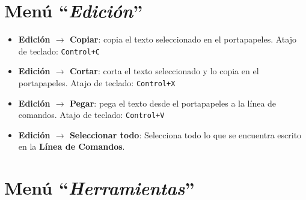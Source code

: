 \section{Men\'u ``\textit{Edici\'on}''}
   \label{Menu-Edicion}

\begin{itemize}
   \item \textbf{Edici\'on $\rightarrow$ Copiar}: copia el texto
      seleccionado en el portapapeles. Atajo de teclado: \texttt{Control+C}
   \item \textbf{Edici\'on $\rightarrow$ Cortar}: corta el texto
      seleccionado y lo copia en el portapapeles. Atajo de teclado:
      \texttt{Control+X}
   \item \textbf{Edici\'on $\rightarrow$ Pegar}: pega el texto desde el
      portapapeles a la l\'inea de comandos. Atajo de teclado:
      \texttt{Control+V}
   \item \textbf{Edici\'on $\rightarrow$ Seleccionar todo}:
      Selecciona todo lo que se encuentra escrito en la
      \textbf{L\'inea de Comandos}.
\end{itemize}

\section{Men\'u ``\textit{Herramientas}''}
   \label{Menu-Herramientas}

